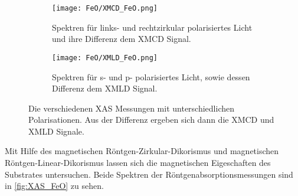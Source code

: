         \begin{figure}
            \centering
            \begin{subfigure}[t]{0.48\textwidth}
                \centering
                \texttt{[image: FeO/XMCD\_FeO.png]}
                \caption{Spektren für links- und rechtzirkular polarisiertes Licht und ihre Differenz dem XMCD Signal.}
                \label{fig:XMCD}
            \end{subfigure}
            \begin{subfigure}[t]{0.48\textwidth}
                \centering
                \texttt{[image: FeO/XMLD\_FeO.png]}
                \caption{Spektren für s- und p- polarisiertes Licht, sowie dessen Differenz dem XMLD Signal.}
                \label{fig:XMLD}
            \end{subfigure}
            \caption{Die verschiedenen XAS Messungen mit unterschiedlichen Polarisationen. Aus der Differenz ergeben sich dann die XMCD und XMLD Signale.}
            \label{fig:XAS_FeO}
        \end{figure}
        Mit Hilfe des magnetischen Röntgen-Zirkular-Dikorismus und magnetischen Röntgen-Linear-Dikorismus lassen sich die magnetischen Eigeschaften des Substrates untersuchen.
        Beide Spektren der Röntgenabsorptionsmessungen sind in \autoref{fig:XAS_FeO} zu sehen.
        
